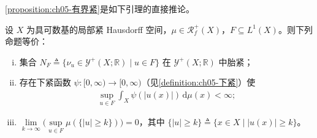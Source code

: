 \documentclass[../../main.tex]{subfiles}%
\begin{document}
\cref{proposition:ch05-有界紧}是如下引理的直接推论。

\begin{lemma}\label{lemma:ch05-胎紧等价}
设 $X$ 为具可数基的局部紧 Hausdorff 空间，$\mu\in\mathscr{R}^+_f(X)$，$F\subseteq L^1(X)$。则下列命题等价：
\begin{enumerate}[(i)]
\item\label{item:ch05-tightfun-i} 集合 $N_F\triangleq\{\nu_u\in\mathcal{Y}^+(X;\mathbb{R})\mid u\in F\}$ 在 $\mathcal{Y}^+(X;\mathbb{R})$ 中胎紧；
\item\label{item:ch05-tightfun-ii} 存在下紧函数 $\psi:[0,\infty)\to[0,\infty)$（见\cref{definition:ch05-下紧}）使
\begin{align}
\sup_{u\in F}\int_X\psi(|u(x)|)\,\mathrm{d}\mu(x)<\infty;\label{align:ch05-5.70}
\end{align}
\item\label{item:ch05-tightfun-iii} $\lim\limits_{k\to\infty}\Big(\sup\limits_{u\in F}\mu(\{|u|\geqslant k\})\Big)=0$，其中 $\{|u|\geqslant k\}\triangleq\{x\in X\mid|u(x)|\geqslant k\}$。
\end{enumerate}
\end{lemma}
\end{document}
